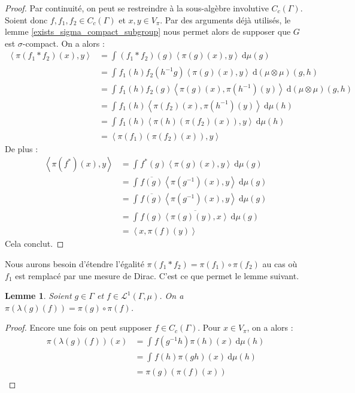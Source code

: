 \documentclass[a4paper,12pt]{article}
\newtheorem{lemma}[theorem]{Lemme}
\newcommand{\ket}[1]{\left\langle #1 \right\rangle}
\newcommand{\integral}[4]{\int_{#1}^{#2} #3~\mathrm{d}#4}
\newcommand{\inv}{^{-1}}
\newcommand{\comp}{\circ}
\begin{document}
\begin{proof}
    Par continuité, on peut se restreindre à la sous-algèbre involutive $C_c(\Gamma)$. Soient donc $f, f_1, f_2\in C_c(\Gamma)$ et $x, y\in V_\pi$. 
    Par des arguments déjà utilisés, le lemme \ref{exists_sigma_compact_subgroup} nous permet alors de supposer que $G$ est $\sigma$-compact. 
    On a alors :
    \begin{align*}
        \ket{\pi(f_1\ast f_2)(x), y}
            &= \integral{}{}{(f_1\ast f_2)(g)\ket{\pi(g)(x), y}}{\mu(g)} \\
            &= \integral{}{}{f_1(h)f_2(h\inv g)\ket{\pi(g)(x), y}}{(\mu\otimes\mu)(g, h)} \\
            &= \integral{}{}{f_1(h)f_2(g)\ket{\pi(g)(x), \pi(h\inv)(y)}}{(\mu\otimes\mu)(g, h)} \\
            &= \integral{}{}{f_1(h)\ket{\pi(f_2)(x), \pi(h\inv)(y)}}{\mu(h)} \\
            &= \integral{}{}{f_1(h)\ket{\pi(h)(\pi(f_2)(x)), y}}{\mu(h)} \\
            &= \ket{\pi(f_1)(\pi(f_2)(x)), y}
    \end{align*}
    De plus :
    \begin{align*}
        \ket{\pi(f^*)(x), y}
            &= \integral{}{}{f^*(g)\ket{\pi(g)(x), y}}{\mu(g)} \\
            &= \integral{}{}{\overline{f(g)}\ket{\pi(g\inv)(x), y}}{\mu(g)} \\
            &= \integral{}{}{\overline{f(g)}\ket{\pi(g\inv)(x), y}}{\mu(g)} \\
            &= \overline{\integral{}{}{f(g)\ket{\pi(g)(y), x}}{\mu(g)}} \\
            &= \ket{x, \pi(f)(y)}
    \end{align*}
    Cela conclut.
\end{proof}

Nous aurons besoin d'étendre l'égalité $\pi(f_1\ast f_2) = \pi(f_1)\comp\pi(f_2)$ 
au cas où $f_1$ est remplacé par une mesure de Dirac. C'est ce que permet le lemme suivant.

\begin{lemma}\label{L1_repr_translate}
    Soient $g \in\Gamma$ et $f\in\mathscr{L}^1(\Gamma, \mu)$. On a $\pi(\lambda(g)(f)) = \pi(g)\comp\pi(f)$.
\end{lemma}

\begin{proof}
    Encore une fois on peut supposer $f\in C_c(\Gamma)$. Pour $x\in V_\pi$, on a alors :
    \begin{align*}
        \pi(\lambda(g)(f))(x) 
            &= \integral{}{}{f(g\inv h)\pi(h)(x)}{\mu(h)} \\
            &= \integral{}{}{f(h)\pi(gh)(x)}{\mu(h)} \\
            &= \pi(g)(\pi(f)(x))
    \end{align*}
\end{proof}
\end{document}
